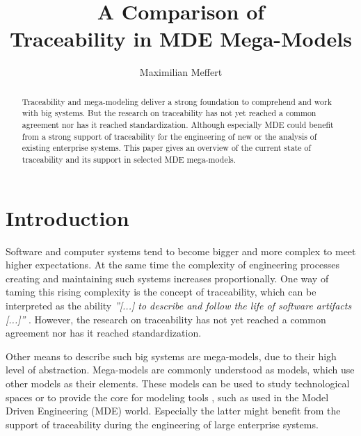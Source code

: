 \documentclass[runningheads,a4paper]{llncs}
\begin{document}

\title{A Comparison of\\ Traceability in MDE Mega-Models}
\author{Maximilian Meffert}
\maketitle


\begin{abstract}

Traceability and mega-modeling deliver a strong foundation to comprehend and work with big systems.
But the research on traceability has not yet reached a common agreement nor has it reached standardization.
Although especially MDE could benefit from a strong support of traceability for the engineering of new or the analysis of existing enterprise systems.
This paper gives an overview of the current state of traceability and its support in selected MDE mega-models.




\end{abstract}


\section{Introduction}\label{sec:Introduction}
Software and computer systems tend to become bigger and more complex to meet higher expectations.
At the same time the complexity of engineering processes creating and maintaining such systems increases proportionally.
One way of taming this rising complexity is the concept of traceability, which can be interpreted as the ability \textit{''[...] to describe and follow the life of software artifacts [...]''} \cite{ScopedTraceability}.
However, the research on traceability has not yet reached a common agreement nor has it reached standardization.

Other means to describe such big systems are mega-models, due to their high level of abstraction.
Mega-models are commonly understood as models, which use other models as their elements.
These models can be used to study technological spaces \cite{MEGAL1}\cite{MEGAL2}\cite{TowardsAMegamodel} or to provide the core for modeling tools \cite{MEGAF}\cite{DHMM}, such as used in the Model Driven Engineering (MDE) world. 
Especially the latter might benefit from the support of traceability during the engineering of large enterprise systems.
\end{document}

